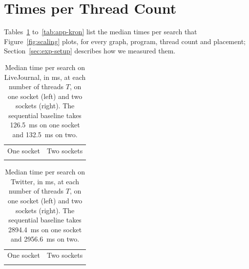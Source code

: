\appendix

\section{Times per Thread Count}
\label{sec:app-times}

Tables~\ref{tab:app-lj} to~\ref{tab:app-kron} list the median times per search that Figure~\ref{fig:scaling} plots, for every graph, program, thread count and placement; Section~\ref{sec:exp-setup} describes how we measured them.


\newcommand{\timestable}[2]{%
    \footnotesize
    \setlength{\tabcolsep}{4pt}
    \begin{tabular}{@{}c@{\hspace{2.5em}}c@{}}
        One socket & Two sockets \\[0.3ex]
        {\pgfplotstabletypeset[times]{#1}} & {\pgfplotstabletypeset[times]{#2}} \\
    \end{tabular}%
}

\begin{table}
    \caption{Median time per search on LiveJournal, in ms, at each number of threads $T$, on one socket (left) and two sockets (right). The sequential baseline takes 126.5~ms on one socket and 132.5~ms on two.}
    \label{tab:app-lj}
    \timestable{\dataOneLJ}{\dataTwoLJ}
\end{table}

\begin{table}
    \caption{Median time per search on Twitter, in ms, at each number of threads $T$, on one socket (left) and two sockets (right). The sequential baseline takes 2894.4~ms on one socket and 2956.6~ms on two.}
    \label{tab:app-twitter}
    \timestable{\dataOneTwitter}{\dataTwoTwitter}
\end{table}

